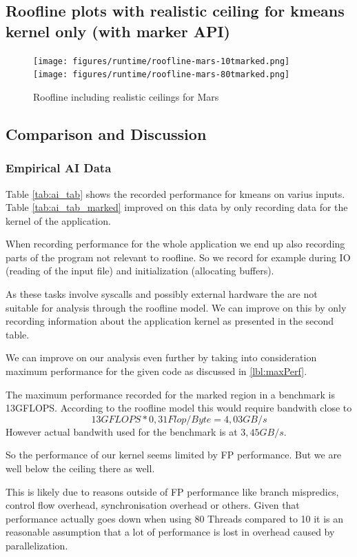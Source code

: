 \subsection{Roofline plots with realistic ceiling for kmeans kernel only (with marker API)}

\begin{figure}[ht]
	\centering
	\texttt{[image: figures/runtime/roofline-mars-10tmarked.png]}
	\texttt{[image: figures/runtime/roofline-mars-80tmarked.png]}
	\caption{Roofline including realistic ceilings for Mars}
	\label{fig:runtimex}
\end{figure}


\subsection{Comparison and Discussion}

\subsubsection{Empirical AI Data}

Table \ref{tab:ai_tab} shows the recorded performance for kmeans on varius inputs.
Table \ref{tab:ai_tab_marked} improved on this data by only recording data for the kernel of the application.

When recording performance for the whole application we end up also recording parts of the program not relevant to roofline.
So we record for example during IO (reading of the input file) and initialization (allocating buffers).

As these tasks involve syscalls and possibly external hardware the are not suitable for analysis through the roofline model.
We can improve on this by only recording information about the application kernel as presented in the second table.

We can improve on our analysis even further by taking into consideration
maximum performance for the given code as discussed in \autoref{lbl:maxPerf}.

The maximum performance recorded for the marked region in a benchmark is 13GFLOPS.
According to the roofline model this would require bandwith close to $$13 GFLOPS * 0,31 Flop/Byte = 4,03 GB/s$$
However actual bandwith used for the benchmark is at $3,45 GB/s$.

So the performance of our kernel seems limited by FP performance. But we are well below the ceiling there as well.

This is likely due to reasons outside of FP performance
like branch mispredics, control flow overhead, synchronisation overhead or others. Given that performance actually goes
down when using 80 Threads compared to 10 it is an reasonable assumption that a lot of performance is lost in overhead
caused by parallelization.


